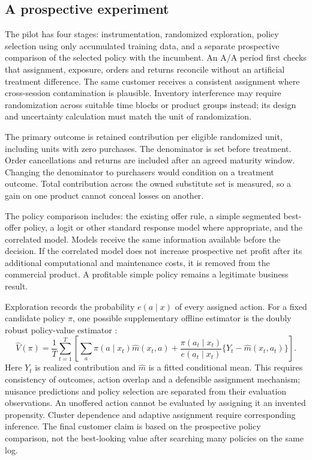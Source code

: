 \documentclass[11pt]{article}
\theoremstyle{remark}\newtheorem{example}{Example}
\begin{document}
\subsection{A prospective experiment}
The pilot has four stages: instrumentation, randomized exploration, policy
selection using only accumulated training data, and a separate prospective
comparison of the selected policy with the incumbent. An A/A period first checks
that assignment, exposure, orders and returns reconcile without an artificial
treatment difference. The same customer receives a consistent assignment where
cross-session contamination is plausible. Inventory interference may require
randomization across suitable time blocks or product groups instead; its design
and uncertainty calculation must match the unit of randomization.

The primary outcome is retained contribution per eligible randomized unit,
including units with zero purchases. The denominator is set before treatment.
Order cancellations and returns are included after an agreed maturity window.
Changing the denominator to purchasers would condition on a treatment outcome.
Total contribution across the owned substitute set is measured, so a gain on
one product cannot conceal losses on another.

The policy comparison includes: the existing offer rule, a simple segmented
best-offer policy, a logit or other standard response model where appropriate,
and the correlated model. Models receive the same information available before
the decision. If the correlated model does not increase prospective net profit
after its additional computational and maintenance costs, it is removed from
the commercial product. A profitable simple policy remains a legitimate
business result.

Exploration records the probability $e(a\mid x)$ of every assigned action.
For a fixed candidate policy $\pi$, one possible supplementary offline estimator
is the doubly robust policy-value estimator \citep{dudik2011}:
\begin{equation}\label{eq:dr}
 \widehat V(\pi)=\frac1T\sum_{t=1}^T\left[
 \sum_a\pi(a\mid x_t)\widehat m(x_t,a)
 +\frac{\pi(a_t\mid x_t)}{e(a_t\mid x_t)}
       \{Y_t-\widehat m(x_t,a_t)\}\right].
\end{equation}
Here $Y_t$ is realized contribution and $\widehat m$ is a fitted conditional
mean. This requires consistency of outcomes, action overlap and a defensible
assignment mechanism; nuisance predictions and policy selection are separated
from their evaluation observations. An unoffered action cannot be evaluated
by assigning it an invented propensity. Cluster dependence and adaptive
assignment require corresponding inference. The final customer claim is based
on the prospective policy comparison, not the best-looking value after searching
many policies on the same log.
\end{document}
